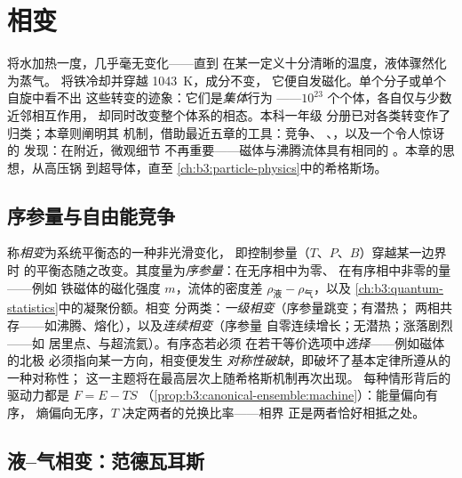 \chapter{相变}\label{ch:b3:phase-transitions}

将水加热一度，几乎毫无变化——直到
在某一定义十分清晰的温度，液体骤然化为蒸气。
将铁冷却并穿越 \qty{1043}{K}，成分不变，
它便自发磁化。单个分子或单个自旋中看不出
这些转变的迹象：它们是\emph{集体}行为
——$10^{23}$ 个个体，各自仅与少数近邻相互作用，
却同时改变整个体系的相态。本科一年级
分册已对各类转变作了归类；本章则阐明其
机制，借助最近五章的工具：竞争、
、，以及一个令人惊讶的
发现：在附近，微观细节
不再重要——磁体与沸腾流体具有相同的
。本章的思想，从高压锅
到超导体，直至
\cref{ch:b3:particle-physics}中的希格斯场。

\section{序参量与自由能竞争}

\begin{definition}[相与序参量]\label{def:b3:phase-transitions:order}
称\emph{相变}为系统平衡态的一种非光滑变化，
即控制参量（$T$、$P$、$B$）穿越某一边界时
的平衡态随之改变。其度量为\emph{序参量}：在无序相中为零、
在有序相中非零的量——例如
铁磁体的磁化强度 $m$，流体的密度差
$\rho_{\text{液}} - \rho_{\text{气}}$，以及
\cref{ch:b3:quantum-statistics}中的凝聚份额。相变
分两类：\emph{一级相变}（序参量跳变；有潜热；
两相共存——如沸腾、熔化），以及\emph{连续相变}（序参量
自零连续增长；无潜热；涨落剧烈——如
居里点、与超流氦）。有序态若必须
在若干等价选项中\emph{选择}——例如磁体的北极
必须指向某一方向，相变便发生
\emph{对称性破缺}，即破坏了基本定律所遵从的一种对称性；
这一主题将在最高层次上随希格斯机制再次出现。
每种情形背后的驱动力都是 $F = E - TS$
（\cref{prop:b3:canonical-ensemble:machine}）：能量偏向有序，
熵偏向无序，$T$ 决定两者的兑换比率——相界
正是两者恰好相抵之处。
\end{definition}

\section{液–气相变：范德瓦耳斯}

